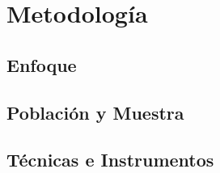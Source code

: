 \chapter{Metodología}
\label{chap:metodologia}
\section{Enfoque}
\section{Población y Muestra}
\section{Técnicas e Instrumentos}
